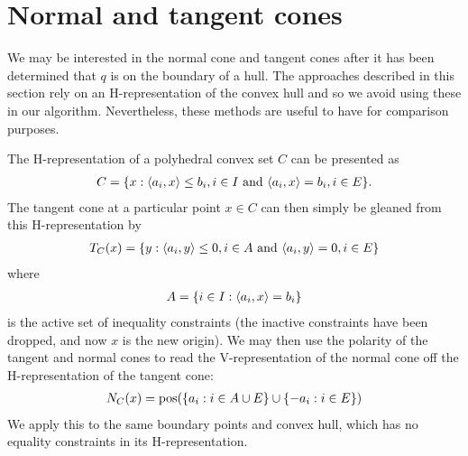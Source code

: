 \section{Normal and tangent cones} \label{S:ncone tcone}
We may be interested in the normal cone and tangent cones after it has been
determined that $q$ is on the boundary of a  hull.  The approaches described
in this section rely on an H-representation of the convex hull and so we avoid 
using these in our algorithm.  Nevertheless, these methods are useful to have for
comparison purposes.

The H-representation of a polyhedral convex set $C$ can be presented as
\begin{align*}
	C = \{ x: \langle a_i, x \rangle \leq b_i, i \in I \text{ and } 
				\langle a_i, x \rangle = b_i, i \in E \}.
\end{align*}
The tangent cone at a particular point $x \in C$ can then simply be gleaned from 
this H-representation by
\begin{align*}
	T_C(x) = \{ y: \langle a_i, y \rangle \leq 0, i \in A \text{ and } 
				\langle a_i, y \rangle = 0, i \in E \}
\end{align*}
where 
\begin{align*}
	A = \{ i \in I: \langle a_i, x \rangle = b_i \}
\end{align*}
is the active set of inequality constraints (the inactive constraints have been
 dropped, and now $x$ is the new origin).
We may then use the polarity of the tangent and normal cones to read the 
V-representation of the normal cone off the H-representation 
of the tangent cone:
\begin{align*}
	N_C(x) = \operatorname{pos}( \{ a_i: i \in A \cup E \} \cup \{ -a_i: i \in E \} )
\end{align*}
We apply this to the same boundary points and convex hull, which has no 
equality constraints in its H-representation.
